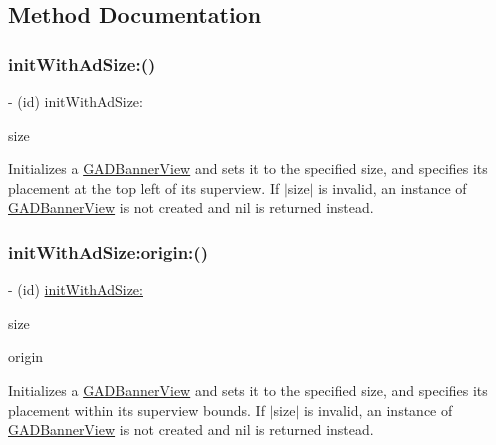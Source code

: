 \subsection{Method Documentation}
\mbox{\label{interfaceGADBannerView_a5abf339e966c5be6ca60fb87328dab39}} 
\subsubsection{\texorpdfstring{init\+With\+Ad\+Size\+:()}{initWithAdSize:()}}
{\footnotesize\ttfamily -\/ (id) init\+With\+Ad\+Size\+: \begin{DoxyParamCaption}\item[{(\hyperlink{structGADAdSize}{G\+A\+D\+Ad\+Size})}]{size }\end{DoxyParamCaption}}

Initializes a \hyperlink{interfaceGADBannerView}{G\+A\+D\+Banner\+View} and sets it to the specified size, and specifies its placement at the top left of its superview. If $\vert$size$\vert$ is invalid, an instance of \hyperlink{interfaceGADBannerView}{G\+A\+D\+Banner\+View} is not created and nil is returned instead. \mbox{\label{interfaceGADBannerView_a567c96091c9e7f1e3c1a86c3c85f03fa}} 
\subsubsection{\texorpdfstring{init\+With\+Ad\+Size\+:origin\+:()}{initWithAdSize:origin:()}}
{\footnotesize\ttfamily -\/ (id) \hyperlink{interfaceGADBannerView_a5abf339e966c5be6ca60fb87328dab39}{init\+With\+Ad\+Size\+:} \begin{DoxyParamCaption}\item[{(\hyperlink{structGADAdSize}{G\+A\+D\+Ad\+Size})}]{size }\item[{origin:(C\+G\+Point)}]{origin }\end{DoxyParamCaption}}

Initializes a \hyperlink{interfaceGADBannerView}{G\+A\+D\+Banner\+View} and sets it to the specified size, and specifies its placement within its superview bounds. If $\vert$size$\vert$ is invalid, an instance of \hyperlink{interfaceGADBannerView}{G\+A\+D\+Banner\+View} is not created and nil is returned instead. \mbox{\label{interfaceGADBannerView_aae670f6f24b63f844440305f9d22b420}} 

